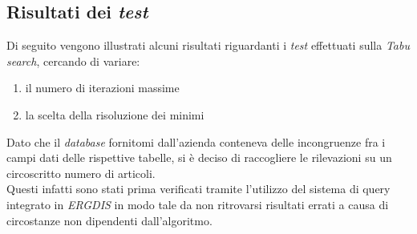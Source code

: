 \subsection{Risultati dei \textit{test}}
\noindent Di seguito vengono illustrati alcuni risultati riguardanti i \textit{test} effettuati sulla
\textit{Tabu search}, cercando di variare:
\begin{enumerate}
    \item il numero di iterazioni massime
    \item la scelta della risoluzione dei minimi
\end{enumerate}
Dato che il \textit{database} fornitomi dall'azienda conteneva delle incongruenze fra i campi dati
delle rispettive tabelle, si è deciso di raccogliere le rilevazioni su un circoscritto
numero di articoli.\\
Questi infatti sono stati prima verificati tramite l'utilizzo del
sistema di query integrato in \textit{ERGDIS} in modo tale da non ritrovarsi risultati errati
a causa di circostanze non dipendenti dall'algoritmo.
